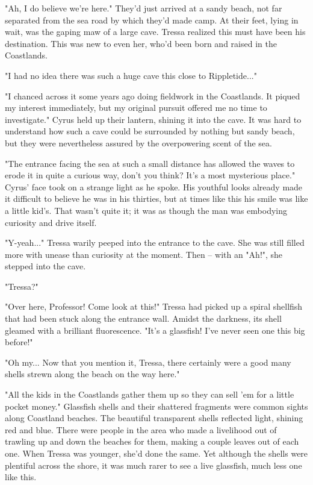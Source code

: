 "Ah, I do believe we're here." They'd just arrived at a sandy beach, not far separated from the sea road by which they'd made camp. At their feet, lying in wait, was the gaping maw of a large cave. Tressa realized this must have been his destination. This was new to even her, who'd been born and raised in the Coastlands.

"I had no idea there was such a huge cave this close to Rippletide..."

"I chanced across it some years ago doing fieldwork in the Coastlands. It piqued my interest immediately, but my original pursuit offered me no time to investigate." Cyrus held up their lantern, shining it into the cave. It was hard to understand how such a cave could be surrounded by nothing but sandy beach, but they were nevertheless assured by the overpowering scent of the sea.

"The entrance facing the sea at such a small distance has allowed the waves to erode it in quite a curious way, don't you think? It's a most mysterious place." Cyrus' face took on a strange light as he spoke. His youthful looks already made it difficult to believe he was in his thirties, but at times like this his smile was like a little kid's. That wasn't quite it; it was as though the man was embodying curiosity and drive itself. 

"Y-yeah..." Tressa warily peeped into the entrance to the cave. She was still filled more with unease than curiosity at the moment. Then -- with an "Ah!", she stepped into the cave.

"Tressa?"

"Over here, Professor! Come look at this!" Tressa had picked up a spiral shellfish that had been stuck along the entrance wall. Amidst the darkness, its shell gleamed with a brilliant fluorescence. "It's a glassfish! I've never seen one this big before!"

"Oh my... Now that you mention it, Tressa, there certainly were a good  many shells strewn along the beach on the way here."

"All the kids in the Coastlands gather them up so they can sell 'em for a little pocket money." Glassfish shells and their shattered fragments were common sights along Coastland beaches. The beautiful transparent shells reflected light, shining red and blue. There were people in the area who made a livelihood out of trawling up and down the beaches for them, making a couple leaves out of each one. When Tressa was younger, she'd done the same. Yet although the shells were plentiful across the shore, it was much rarer to see a live glassfish, much less one like this.

